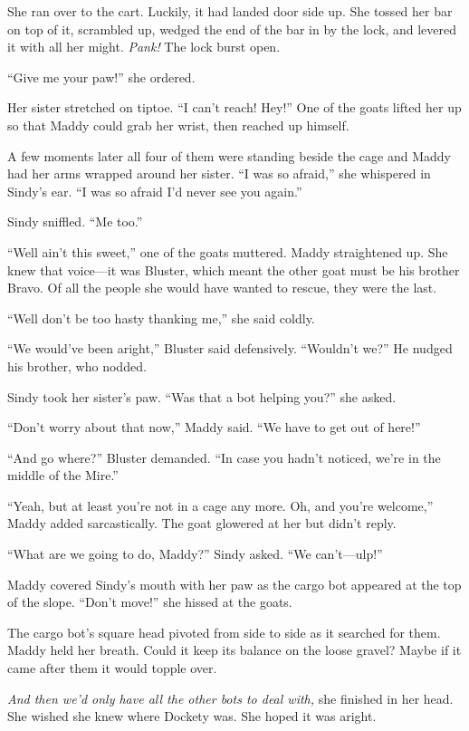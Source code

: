 \documentclass[10pt]{article}
\begin{document}
She ran over to the cart. Luckily, it had landed door side up. She
tossed her bar on top of it, scrambled up, wedged the end of the bar in
by the lock, and levered it with all her might. \emph{Pank!} The lock
burst open.

``Give me your paw!'' she ordered.

Her sister stretched on tiptoe. ``I can't reach! Hey!'' One of the goats
lifted her up so that Maddy could grab her wrist, then reached up
himself.

A few moments later all four of them were standing beside the cage and
Maddy had her arms wrapped around her sister. ``I was so afraid,'' she
whispered in Sindy's ear. ``I was so afraid I'd never see you again.''

Sindy sniffled. ``Me too.''

``Well ain't this sweet,'' one of the goats muttered. Maddy straightened
up. She knew that voice---it was Bluster, which meant the other goat
must be his brother Bravo. Of all the people she would have wanted to
rescue, they were the last.

``Well don't be too hasty thanking me,'' she said coldly.

``We would've been aright,'' Bluster said defensively. ``Wouldn't we?''
He nudged his brother, who nodded.

Sindy took her sister's paw. ``Was that a bot helping you?'' she asked.

``Don't worry about that now,'' Maddy said. ``We have to get out of
here!''

``And go where?'' Bluster demanded. ``In case you hadn't noticed, we're
in the middle of the Mire.''

``Yeah, but at least you're not in a cage any more. Oh, and you're
welcome,'' Maddy added sarcastically. The goat glowered at her but
didn't reply.

``What are we going to do, Maddy?'' Sindy asked. ``We can't---ulp!''

Maddy covered Sindy's mouth with her paw as the cargo bot appeared at
the top of the slope. ``Don't move!'' she hissed at the goats.

The cargo bot's square head pivoted from side to side as it searched for
them. Maddy held her breath. Could it keep its balance on the loose
gravel? Maybe if it came after them it would topple over.

\emph{And then we'd only have all the other bots to deal with,} she
finished in her head. She wished she knew where Dockety was. She hoped
it was aright.
\end{document}
